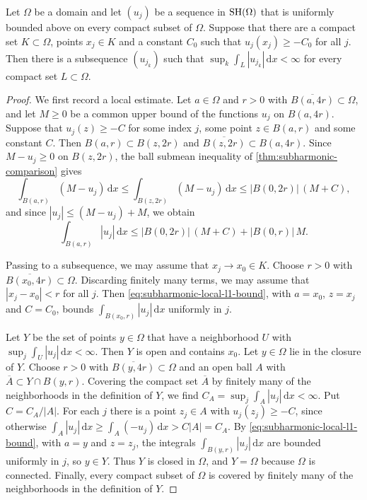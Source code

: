 \begin{lemma}\label{lem:subharmonic-l1-bounds}
Let $\Omega$ be a domain and let $(u_j)$ be a sequence in $\mathrm{SH}(\Omega)$ that is uniformly bounded above on every compact subset of $\Omega$. Suppose that there are a compact set $K\subset\Omega$, points $x_j\in K$ and a constant $C_0$ such that $u_j(x_j)\geq-C_0$ for all $j$. Then there is a subsequence $(u_{j_k})$ such that $\sup_k\int_L|u_{j_k}|\,\mathrm d x<\infty$ for every compact set $L\subset\Omega$.
\end{lemma}
\begin{proof}
We first record a local estimate. Let $a\in\Omega$ and $r>0$ with $\overline{B(a,4r)}\subset\Omega$, and let $M\geq0$ be a common upper bound of the functions $u_j$ on $B(a,4r)$. Suppose that $u_j(z)\geq-C$ for some index $j$, some point $z\in B(a,r)$ and some constant $C$. Then $B(a,r)\subset B(z,2r)$ and $\overline{B(z,2r)}\subset B(a,4r)$. Since $M-u_j\geq0$ on $B(z,2r)$, the ball submean inequality of \cref{thm:subharmonic-comparison} gives
\[
 \int_{B(a,r)}(M-u_j)\,\mathrm d x
 \leq\int_{B(z,2r)}(M-u_j)\,\mathrm d x
 \leq|B(0,2r)|\,(M+C),
\]
and since $|u_j|\leq(M-u_j)+M$, we obtain
\begin{equation}\label{eq:subharmonic-local-l1-bound}
 \int_{B(a,r)}|u_j|\,\mathrm d x\leq|B(0,2r)|\,(M+C)+|B(0,r)|\,M.
\end{equation}

Passing to a subsequence, we may assume that $x_j\to x_0\in K$. Choose $r>0$ with $\overline{B(x_0,4r)}\subset\Omega$. Discarding finitely many terms, we may assume that $|x_j-x_0|<r$ for all $j$. Then \eqref{eq:subharmonic-local-l1-bound}, with $a=x_0$, $z=x_j$ and $C=C_0$, bounds $\int_{B(x_0,r)}|u_j|\,\mathrm d x$ uniformly in $j$.

Let $Y$ be the set of points $y\in\Omega$ that have a neighborhood $U$ with $\sup_j\int_U|u_j|\,\mathrm d x<\infty$. Then $Y$ is open and contains $x_0$. Let $y\in\Omega$ lie in the closure of $Y$. Choose $r>0$ with $\overline{B(y,4r)}\subset\Omega$ and an open ball $A$ with $\overline A\subset Y\cap B(y,r)$. Covering the compact set $\overline A$ by finitely many of the neighborhoods in the definition of $Y$, we find $C_A=\sup_j\int_A|u_j|\,\mathrm d x<\infty$. Put $C=C_A/|A|$. For each $j$ there is a point $z_j\in A$ with $u_j(z_j)\geq-C$, since otherwise $\int_A|u_j|\,\mathrm d x\geq\int_A(-u_j)\,\mathrm d x>C|A|=C_A$. By \eqref{eq:subharmonic-local-l1-bound}, with $a=y$ and $z=z_j$, the integrals $\int_{B(y,r)}|u_j|\,\mathrm d x$ are bounded uniformly in $j$, so $y\in Y$. Thus $Y$ is closed in $\Omega$, and $Y=\Omega$ because $\Omega$ is connected. Finally, every compact subset of $\Omega$ is covered by finitely many of the neighborhoods in the definition of $Y$.
\end{proof}

